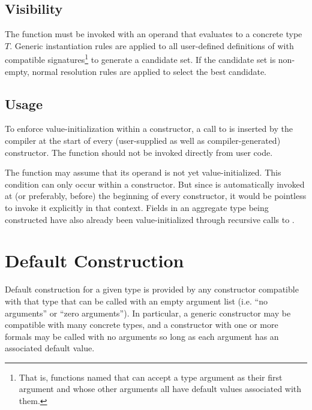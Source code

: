 \subsection{Visibility}

The  function must be invoked with an operand that evaluates
to a concrete type $T$.  Generic instantiation rules are applied to all
user-defined definitions of  with compatible
signatures\footnote{That is, functions named  that can accept a type
  argument as their first argument and whose other arguments all have default
  values associated with them.} to generate a candidate set.  If the candidate
set is non-empty, normal resolution rules are applied to select the best
candidate.

\subsection{Usage}

To enforce value-initialization within a constructor, a call to  is
inserted by the compiler at the start of every (user-supplied as well as
compiler-generated) constructor.  The  function should not be
invoked directly from user code.

\begin{rationale}

The  function may assume that its operand is not yet
value-initialized.  This condition can only occur within a constructor.  But since
 is automatically invoked at (or preferably, before) the
beginning of every constructor, it would be pointless to invoke it explicitly in
that context. Fields in an aggregate type being constructed have also already been
value-initialized through recursive calls to .

\end{rationale}



\section{Default Construction}

Default construction for a given type is provided by any constructor compatible
with that type that can be called with an empty argument list (i.e. ``no
arguments'' or ``zero arguments'').  In particular, a generic constructor may be
compatible with many concrete types, and a constructor with one or more formals
may be called with no arguments so long as each argument has an associated
default value.

